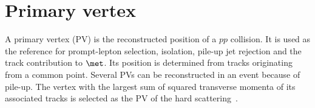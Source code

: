 \section{Primary vertex}
\label{sec:ch6_primary_vertex}

A primary vertex (PV) is the reconstructed position of a $pp$ collision.
It is used as the reference for prompt-lepton selection, isolation, pile-up jet rejection and the track contribution to $\met$.
Its position is determined from tracks originating from a common point.
Several PVs can be reconstructed in an event because of pile-up.
The vertex with the largest sum of squared transverse momenta of its associated tracks is selected as the PV of the hard scattering~\cite{ATLAS2015Vertex}.
